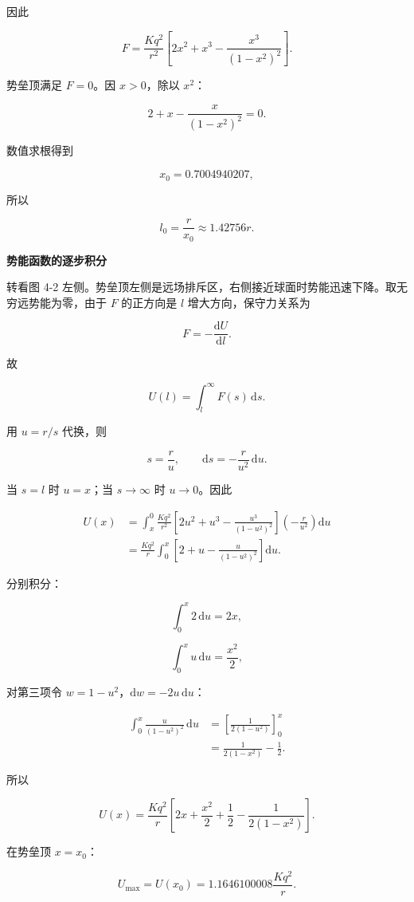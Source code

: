 \documentclass[12pt,a4paper,UTF8]{ctexart}
\begin{document}
因此

\[F=\frac{Kq^2}{r^2}\left[
2x^2+x^3-\frac{x^3}{(1-x^2)^2}
\right].\]

势垒顶满足 \(F=0\)。因 \(x>0\)，除以 \(x^2\)：

\[\boxed{
2+x-\frac{x}{(1-x^2)^2}=0
}.\]

数值求根得到

\[\boxed{x_0=0.7004940207},\]

所以

\[l_0=\frac{r}{x_0}\approx1.42756r.\]

\textbf{势能函数的逐步积分}

转看图 4-2
左侧。势垒顶左侧是远场排斥区，右侧接近球面时势能迅速下降。取无穷远势能为零，由于
\(F\) 的正方向是 \(l\) 增大方向，保守力关系为

\[F=-\frac{\mathrm{d}U}{\mathrm{d}l}.\]

故

\[U(l)=\int_l^\infty F(s)\,\mathrm{d}s.\]

用 \(u=r/s\) 代换，则

\[s=\frac ru,\qquad \mathrm{d}s=-\frac r{u^2}\,\mathrm{d}u.\]

当 \(s=l\) 时 \(u=x\)；当 \(s\to\infty\) 时 \(u\to0\)。因此

\[\begin{aligned}
U(x)
&=\int_x^0\frac{Kq^2}{r^2}\left[
2u^2+u^3-\frac{u^3}{(1-u^2)^2}
\right]\left(-\frac r{u^2}\right)\mathrm{d}u\\
&=\frac{Kq^2}{r}
\int_0^x\left[
2+u-\frac{u}{(1-u^2)^2}
\right]\mathrm{d}u.
\end{aligned}\]

分别积分：

\[\int_0^x2\,\mathrm{d}u=2x,\]

\[\int_0^xu\,\mathrm{d}u=\frac{x^2}{2},\]

对第三项令 \(w=1-u^2\)，\(\mathrm{d}w=-2u\,\mathrm{d}u\)：

\[\begin{aligned}
\int_0^x\frac{u}{(1-u^2)^2}\,\mathrm{d}u
&=\left[\frac{1}{2(1-u^2)}\right]_0^x\\
&=\frac{1}{2(1-x^2)}-\frac12.
\end{aligned}\]

所以

\[\boxed{
U(x)=\frac{Kq^2}{r}\left[
2x+\frac{x^2}{2}+\frac12-
\frac{1}{2(1-x^2)}
\right]
}.\]

在势垒顶 \(x=x_0\)：

\[U_{\max}=U(x_0)=1.1646100008\frac{Kq^2}{r}.\]
\end{document}

